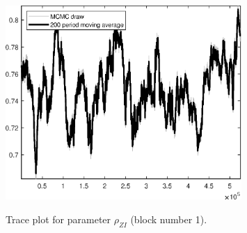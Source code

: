 \begin{figure}[H]
\centering
  \includegraphics[width=0.8\textwidth]{BRS_growth_KPR/graphs/TracePlot_rho_ZI_blck_1}\\
    \caption{Trace plot for parameter ${\rho_{ZI}}$ (block number 1).}
\end{figure}
